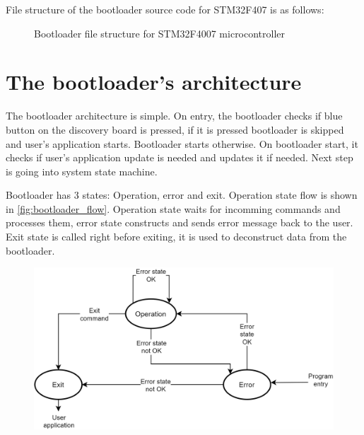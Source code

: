 File structure of the bootloader source code for STM32F407 is as follows:
\begin{figure}[H]
\caption{Bootloader file structure for STM32F4007 microcontroller}
\label{tree:bootloader}
\end{figure}

\section{The bootloader's architecture}

The bootloader architecture is simple. On entry, the bootloader checks if blue button on the discovery board is pressed, if it is pressed bootloader is skipped and user's application starts. Bootloader starts otherwise. On bootloader start, it checks if user's application update is needed and updates it if needed. Next step is going into system state machine.

Bootloader has 3 states: Operation, error and exit. Operation state flow is shown in \autoref{fig:bootloader_flow}. Operation state waits for incomming commands and processes them, error state constructs and sends error message back to the user. Exit state is called right before exiting, it is used to deconstruct data from the bootloader.



\begin{figure}[H]
    \centering
    \includegraphics[width=.8\linewidth]{images/bootloader_flow.png}
    \label{fig:bootloader_flow}
\end{figure}

